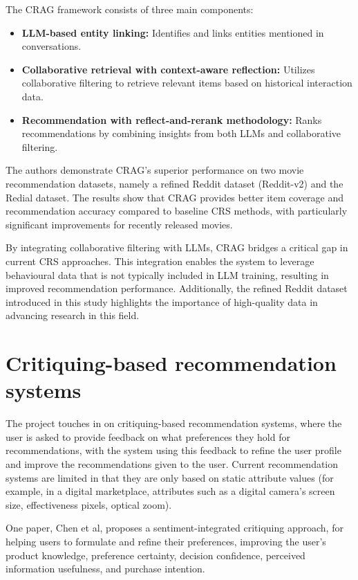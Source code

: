 The CRAG framework consists of three main components:
\begin{itemize}
    \item \textbf{LLM-based entity linking:} Identifies and links entities mentioned in conversations.
    \item \textbf{Collaborative retrieval with context-aware reflection:} Utilizes collaborative filtering to retrieve relevant items based on historical interaction data.
    \item \textbf{Recommendation with reflect-and-rerank methodology:} Ranks recommendations by combining insights from both LLMs and collaborative filtering.
\end{itemize}

The authors demonstrate CRAG's superior performance on two movie recommendation datasets, namely a refined Reddit dataset (Reddit-v2) and the Redial dataset. The results show that CRAG provides better item coverage and recommendation accuracy compared to baseline CRS methods, with particularly significant improvements for recently released movies.

By integrating collaborative filtering with LLMs, CRAG bridges a critical gap in current CRS approaches. This integration enables the system to leverage behavioural data that is not typically included in LLM training, resulting in improved recommendation performance. Additionally, the refined Reddit dataset introduced in this study highlights the importance of high-quality data in advancing research in this field.


\section{Critiquing-based recommendation systems}
The project touches in on critiquing-based recommendation systems, where the user is asked to provide feedback on what preferences they hold for recommendations, with the system using this feedback to refine the user profile and improve the recommendations given to the user.
Current recommendation systems are limited in that they are only based on static attribute values (for example, in a digital marketplace, attributes such as a digital camera’s screen size, effectiveness pixels, optical zoom).

One paper, Chen et al\cite{CHEN20194}, proposes a sentiment-integrated critiquing approach, for helping users to formulate and refine their preferences, improving the user's product knowledge, preference certainty, decision confidence, perceived information usefulness, and purchase intention.

